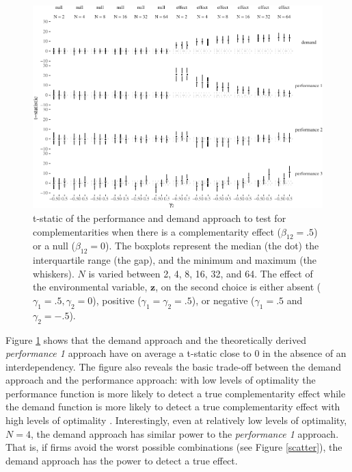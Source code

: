 \documentclass[12pt]{article}
\begin{document}
\begin{figure}

\includegraphics[width=500px]{figure-latex/unnamed-chunk-5-1}
\caption[Error Rate and Power of Demand and Performance Specification]
{\label{basic} t-static of the performance and demand approach to test
for complementarities when there is a complementarity effect ($\beta_{12} = .5$)
or a null ($\beta_{12} = 0$). The boxplots represent the median (the dot) the
interquartile range (the gap), and the minimum and maximum (the whiskers). $N$
is varied between 2, 4, 8, 16, 32, and 64. The effect of the environmental
variable, $\mathbf{z}$, on the second choice is either absent
($\gamma_1 = .5,  \gamma_2 = 0$), positive ($\gamma_1 = \gamma_2 = .5$),
or negative ($\gamma_1 = .5$ and $\gamma_2 = -.5$).}
\end{figure}

Figure \ref{basic} shows that the demand approach and the theoretically
derived \emph{performance 1} approach have on average a t-static close
to 0 in the absence of an interdependency. The figure also reveals the
basic trade-off between the demand approach and the performance
approach: with low levels of optimality the performance function is more
likely to detect a true complementarity effect while the demand function
is more likely to detect a true complementarity effect with high levels
of optimality \citep{Grabner2013, Aral2012}. Interestingly, even at
relatively low levels of optimality, \(N = 4\), the demand approach has
similar power to the \emph{performance 1} approach. That is, if firms
avoid the worst possible combinations (see Figure \ref{scatter}), the
demand approach has the power to detect a true effect.
\end{document}
